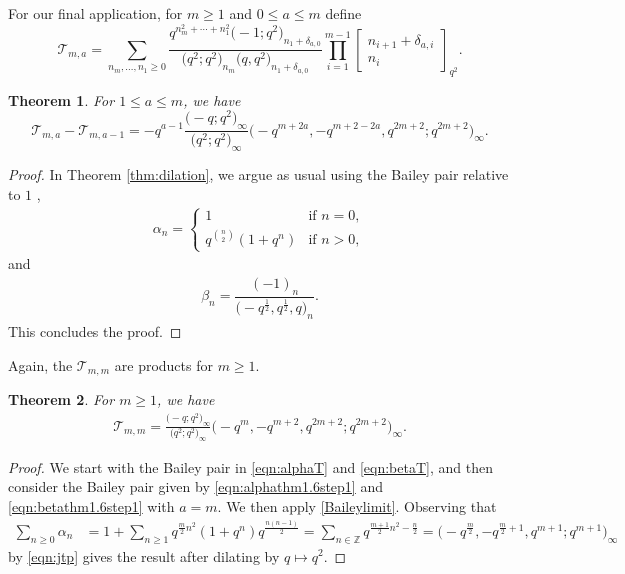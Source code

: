 \documentclass[pdftex]{sigma}
\newtheorem{Theorem}{Theorem}[section]
\numberwithin{equation}{section}
\newcommand{\ZZ}{\mathbb{Z}}
\begin{document}
For our final application, for $m \geq 1$ and $0 \leq a \leq m$ define
\begin{equation*}
\mathscr{T}_{m,a} = \sum_{n_m, \dots, n_1 \geq 0} \frac{q^{n_m^2 + \cdots + n_1^2}\bigl(-1;q^2\bigr)_{n_1 + \delta_{a,0}}}{\bigl(q^2;q^2\bigr)_{n_m}\bigl(q,q^2\bigr)_{n_1 + \delta_{a,0}}} \prod_{i=1}^{m-1} \begin{bmatrix} n_{i+1} + \delta_{a,i} \\ n_i \end{bmatrix}_{q^2}.
\end{equation*}

\begin{Theorem}
For $1 \leq a \leq m$, we have
\begin{equation*}
	\mathscr{T}_{m,a} - \mathscr{T}_{m,a-1} = -q^{a-1}\frac{\bigl(-q;q^2\bigr)_{\infty}}{\bigl(q^2;q^2\bigr)_{\infty}}\bigl(-q^{m+2a},-q^{m+2-2a},q^{2m+2};q^{2m+2}\bigr)_{\infty}.
\end{equation*}
\end{Theorem}

\begin{proof}
In Theorem \ref{thm:dilation}, we argue as usual using the Bailey pair relative to $1$ \cite[p.~468, corrected]{Sl1},
\begin{align}
	\alpha_n=
	\begin{cases}
		1 & \text{if $n=0$},\\
		q^{\binom{n}{2}}(1+q^n) & \text{if $n>0$},
	\end{cases}
	\label{eqn:alphaT}
\end{align}
and
\begin{align}
	\beta_n=\dfrac{(-1)_n}{\bigl(-q^{\frac{1}{2}},q^{\frac{1}{2}},q\bigr)_n}.
	\label{eqn:betaT}
\end{align}
This concludes the proof.
\end{proof}

Again, the $\mathscr{T}_{m,m}$ are products for $m\geq 1$.
\begin{Theorem}
For $m\geq 1$, we have
\begin{align*}	\mathscr{T}_{m,m}=\frac{\bigl(-q;q^2\bigr)_{\infty}}{\bigl(q^2;q^2\bigr)_{\infty}}\bigl(-q^{m},-q^{m+2},q^{2m+2};q^{2m+2}\bigr)_{\infty}.
\end{align*}
\end{Theorem}
\begin{proof}
We start with the Bailey pair in \eqref{eqn:alphaT} and \eqref{eqn:betaT}, and then consider the Bailey pair given by \eqref{eqn:alphathm1.6step1} and \eqref{eqn:betathm1.6step1} with $a=m$. We then apply \eqref{Baileylimit}. Observing that
\begin{align*}
	\sum_{n\geq 0} \alpha_n &{}=1+ \sum_{n\geq 1} q^{\frac{m}{2}n^2}(1+q^n)q^{\frac{n(n-1)}{2}}
	 =\sum_{n\in\ZZ}q^{\frac{m+1}{2}n^2-\frac{n}{2}}
	 =\bigl(-q^{\frac{m}{2}} ,-q^{\frac{m}{2}+1},q^{m+1};q^{m+1}\bigr)_\infty
\end{align*}
by \eqref{eqn:jtp} gives the result after dilating by $q\mapsto q^2$.
\end{proof}
\end{document}
